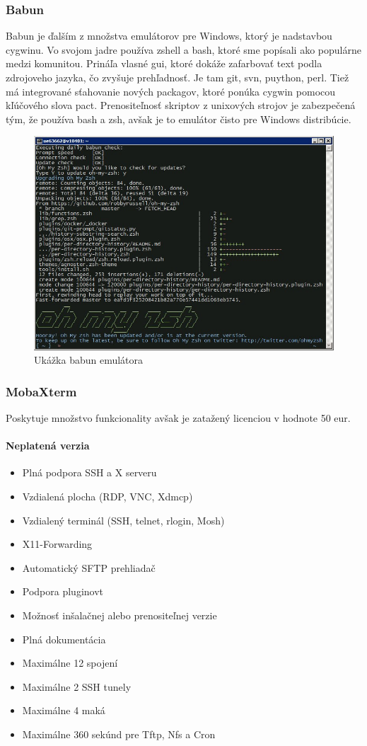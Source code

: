 \subsubsection{Babun}
\indent Babun je ďalším z množstva emulátorov pre Windows, ktorý je nadstavbou cygwinu. Vo svojom jadre používa zshell a bash, ktoré sme popísali ako populárne medzi komunitou. Prináľa vlasné gui, ktoré dokáže zafarbovať text podla zdrojoveho jazyka, čo zvyšuje prehľadnosť. Je tam git, svn, puython, perl. Tiež má integrované sťahovanie nových packagov, ktoré ponúka cygwin pomocou kľúčového slova pact. Prenositeľnosť skriptov z unixových strojov je zabezpečená tým, že používa bash a zsh, avšak je to emulátor čisto pre Windows distribúcie.\cite{babun}
\begin{figure}[!htbp]
	\centering
	\includegraphics[scale=0.4]{img/babun.jpeg}
	\caption{Ukážka babun emulátora}
	\label{fig:test}
\end{figure}
\subsubsection{MobaXterm}
\indent Poskytuje množstvo funkcionality avšak je zatažený licenciou v hodnote 50 eur. \cite{mobaxterm}
\paragraph{Neplatená verzia}
\begin{itemize}
	\item Plná podpora SSH a X serveru
	\item Vzdialená plocha (RDP, VNC, Xdmcp)
	\item Vzdialený terminál (SSH, telnet, rlogin, Mosh)
	\item X11-Forwarding
	\item Automatický SFTP prehliadač
	\item Podpora pluginovt
	\item Možnosť inšalačnej alebo prenositeľnej verzie
	\item Plná dokumentácia
	\item Maximálne 12 spojení
	\item Maximálne 2 SSH tunely
	\item Maximálne 4 maká
	\item Maximálne 360 sekúnd pre Tftp, Nfs a Cron
\end{itemize}

